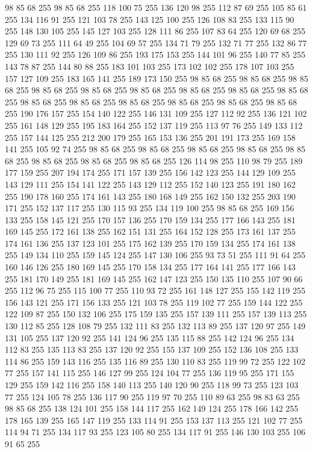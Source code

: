 98 85 68 255 98 85 68 255 118 100 75 255 136 120 98 255 112 87 69 255 105 85 61 255 134 116 91 255 121 103 78 255 143 125 100 255 126 108 83 255 133 115 90 255 148 130 105 255 145 127 103 255 128 111 86 255 107 83 64 255 120 69 68 255 129 69 73 255 111 64 49 255 104 69 57 255 134 71 79 255 132 71 77 255 132 86 77 255 130 111 92 255 126 109 86 255 193 175 153 255 144 101 96 255 140 77 85 255 143 78 87 255 144 80 88 255 183 101 103 255 173 102 102 255 178 107 103 255 157 127 109 255 183 165 141 255 189 173 150 255 98 85 68 255 98 85 68 255 98 85 68 255 98 85 68 255 98 85 68 255 98 85 68 255 98 85 68 255 98 85 68 255 98 85 68 255 98 85 68 255 98 85 68 255 98 85 68 255 98 85 68 255 98 85 68 255 98 85 68 255 190 176 157 255 154 140 122 255 146 131 109 255 127 112 92 255 136 121 102 255 161 148 129 255 195 183 164 255 152 137 119 255 113 97 76 255 149 133 112 255 157 144 125 255 212 200 179 255 165 153 136 255 201 191 173 255
169 158 141 255 105 92 74 255 98 85 68 255 98 85 68 255 98 85 68 255 98 85 68 255 98 85 68 255 98 85 68 255 98 85 68 255 98 85 68 255 126 114 98 255 110 98 79 255 189 177 159 255 207 194 174 255 171 157 139 255 156 142 123 255 144 129 109 255 143 129 111 255 154 141 122 255 143 129 112 255 152 140 123 255 191 180 162 255 190 178 160 255 174 161 143 255 180 168 149 255 162 150 132 255 203 190 171 255 152 137 117 255 130 115 93 255 134 119 100 255 98 85 68 255 169 156 133 255 158 145 121 255 170 157 136 255 170 159 134 255 177 166 143 255 181 169 145 255 172 161 138 255 162 151 131 255 164 152 128 255 173 161 137 255 174 161 136 255 137 123 101 255 175 162 139 255 170 159 134 255 174 161 138 255 149 134 110 255 159 145 124 255 147 130 106 255 93 73 51 255 111 91 64 255 160 146 126 255 180 169 145 255 170 158 134 255 177 164 141 255 177 166 143 255 181 170 149 255 181 169 145 255 162 147 123 255 150 135 110 255 107 90 66 255 112 96 75 255 115 100 77 255 110 93 72 255
161 148 127 255 155 142 119 255 156 143 121 255 171 156 133 255 121 103 78 255 119 102 77 255 159 144 122 255 122 109 87 255 150 132 106 255 175 159 135 255 157 139 111 255 157 139 113 255 130 112 85 255 128 108 79 255 132 111 83 255 132 113 89 255 137 120 97 255 149 131 105 255 137 120 92 255 141 124 96 255 135 115 88 255 142 124 96 255 134 112 83 255 135 113 83 255 137 120 92 255 155 137 109 255 152 136 108 255 133 114 86 255 159 143 116 255 135 116 89 255 130 110 83 255 119 99 72 255 122 102 77 255 157 141 115 255 146 127 99 255 124 104 77 255 136 119 95 255 171 155 129 255 159 142 116 255 158 140 113 255 140 120 90 255 118 99 73 255 123 103 77 255 124 105 78 255 136 117 90 255 119 97 70 255 110 89 63 255 98 83 63 255 98 85 68 255 138 124 101 255 158 144 117 255 162 149 124 255 178 166 142 255 178 165 139 255 165 147 119 255 133 114 91 255 153 137 113 255 121 102 77 255 114 94 71 255 134 117 93 255 123 105 80 255 134 117 91 255 146 130 103 255 106 91 65 255

